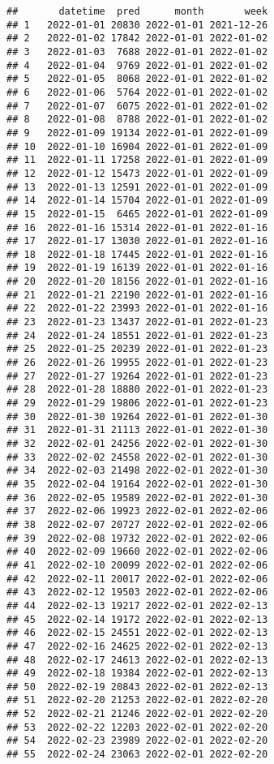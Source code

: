 \documentclass[
]{article}
\begin{document}
\begin{verbatim}
##       datetime  pred      month       week
## 1   2022-01-01 20830 2022-01-01 2021-12-26
## 2   2022-01-02 17842 2022-01-01 2022-01-02
## 3   2022-01-03  7688 2022-01-01 2022-01-02
## 4   2022-01-04  9769 2022-01-01 2022-01-02
## 5   2022-01-05  8068 2022-01-01 2022-01-02
## 6   2022-01-06  5764 2022-01-01 2022-01-02
## 7   2022-01-07  6075 2022-01-01 2022-01-02
## 8   2022-01-08  8788 2022-01-01 2022-01-02
## 9   2022-01-09 19134 2022-01-01 2022-01-09
## 10  2022-01-10 16904 2022-01-01 2022-01-09
## 11  2022-01-11 17258 2022-01-01 2022-01-09
## 12  2022-01-12 15473 2022-01-01 2022-01-09
## 13  2022-01-13 12591 2022-01-01 2022-01-09
## 14  2022-01-14 15704 2022-01-01 2022-01-09
## 15  2022-01-15  6465 2022-01-01 2022-01-09
## 16  2022-01-16 15314 2022-01-01 2022-01-16
## 17  2022-01-17 13030 2022-01-01 2022-01-16
## 18  2022-01-18 17445 2022-01-01 2022-01-16
## 19  2022-01-19 16139 2022-01-01 2022-01-16
## 20  2022-01-20 18156 2022-01-01 2022-01-16
## 21  2022-01-21 22190 2022-01-01 2022-01-16
## 22  2022-01-22 23993 2022-01-01 2022-01-16
## 23  2022-01-23 13437 2022-01-01 2022-01-23
## 24  2022-01-24 18551 2022-01-01 2022-01-23
## 25  2022-01-25 20239 2022-01-01 2022-01-23
## 26  2022-01-26 19955 2022-01-01 2022-01-23
## 27  2022-01-27 19264 2022-01-01 2022-01-23
## 28  2022-01-28 18880 2022-01-01 2022-01-23
## 29  2022-01-29 19806 2022-01-01 2022-01-23
## 30  2022-01-30 19264 2022-01-01 2022-01-30
## 31  2022-01-31 21113 2022-01-01 2022-01-30
## 32  2022-02-01 24256 2022-02-01 2022-01-30
## 33  2022-02-02 24558 2022-02-01 2022-01-30
## 34  2022-02-03 21498 2022-02-01 2022-01-30
## 35  2022-02-04 19164 2022-02-01 2022-01-30
## 36  2022-02-05 19589 2022-02-01 2022-01-30
## 37  2022-02-06 19923 2022-02-01 2022-02-06
## 38  2022-02-07 20727 2022-02-01 2022-02-06
## 39  2022-02-08 19732 2022-02-01 2022-02-06
## 40  2022-02-09 19660 2022-02-01 2022-02-06
## 41  2022-02-10 20099 2022-02-01 2022-02-06
## 42  2022-02-11 20017 2022-02-01 2022-02-06
## 43  2022-02-12 19503 2022-02-01 2022-02-06
## 44  2022-02-13 19217 2022-02-01 2022-02-13
## 45  2022-02-14 19172 2022-02-01 2022-02-13
## 46  2022-02-15 24551 2022-02-01 2022-02-13
## 47  2022-02-16 24625 2022-02-01 2022-02-13
## 48  2022-02-17 24613 2022-02-01 2022-02-13
## 49  2022-02-18 19384 2022-02-01 2022-02-13
## 50  2022-02-19 20843 2022-02-01 2022-02-13
## 51  2022-02-20 21253 2022-02-01 2022-02-20
## 52  2022-02-21 21246 2022-02-01 2022-02-20
## 53  2022-02-22 12203 2022-02-01 2022-02-20
## 54  2022-02-23 23989 2022-02-01 2022-02-20
## 55  2022-02-24 23063 2022-02-01 2022-02-20

\end{verbatim}
\end{document}

